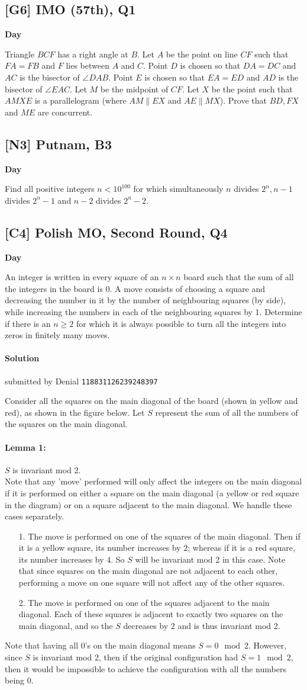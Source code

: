 \documentclass[10pt]{article}
\newcommand{\themonth}{March}
\newcommand{\theyear}{2019}
\newcounter{day}
\newcounter{solution}
\newcounter{datenumber}
\newcommand{\problem}[4][0]{
	\newpage
	\subsection{[#3] \space #2} \hfill 
	{\large\textbf{Day \arabic{day}}} %
	\begin{flushleft} #4 \end{flushleft}
	\vspace{1em}
	\addtocounter{day}{1}
	\addtocounter{datenumber}{1}
	\setcounter{solution}{1}
}
\newcommand{\solution}[4][0]{
	\paragraph{Solution \arabic{solution}} \hfill submitted by #2 \hfill \texttt{#3}
	\begin{flushleft} #4 \end{flushleft}
	\addtocounter{solution}{1}
	\vspace{1em}
}
\begin{document}
\problem[28]{2016 IMO (57th), Q1}{G6}{Triangle $BCF$ has a right angle at $B$. Let $A$ be the point on line $CF$ such that $FA=FB$ and $F$ lies between $A$ and $C$. Point $D$ is chosen so that $DA=DC$ and $AC$ is the bisector of $\angle{DAB}$. Point $E$ is chosen so that $EA=ED$ and $AD$ is the bisector of $\angle{EAC}$. Let $M$ be the midpoint of $CF$. Let $X$ be the point such that $AMXE$ is a parallelogram (where $AM \parallel EX$ and $AE \parallel MX$). Prove that $BD,FX$ and $ME$ are concurrent.}

\problem[29]{2018 Putnam, B3}{N3}{Find all positive integers $n < 10^{100}$ for which simultaneously $n$ divides $2^n, n - 1$ divides $2^n - 1$ and $n - 2$ divides $2^n - 2$.}

\problem[30]{2008 Polish MO, Second Round, Q4}{C4}{An integer is written in every square of an $n \times n$ board such that the sum of all the integers in the board is 0. A move consists of choosing a square and decreasing the number in it by the number of neighbouring squares (by side), while increasing the numbers in each of the neighbouring squares by 1. Determine if there is an $n \geq 2$ for which it is always possible to turn all the integers into zeros in finitely many moves.}

\solution[30]{Denial}{118831126239248397}{
Consider all the squares on the main diagonal of the board (shown in yellow and red), as shown in the figure below. Let $S$ represent the sum of all the numbers of the squares on the main diagonal. \\ 

\paragraph{Lemma 1: }$S$ is invariant mod 2. \\
Note that any 'move' performed will only affect the integers on the main diagonal if it is performed on either a square on the main diagonal (a yellow or red square in the diagram) or on a square adjacent to the main diagonal. We handle these cases separately. 
\begin{enumerate}
	\item[1. ]The move is performed on one of the squares of the main diagonal. Then if it is a yellow square, its number increases by $2$; whereas if it is a red square, its number increases by $4$. So $S$ will be invariant mod 2 in this case. Note that since squares on the main diagonal are not adjacent to each other, performing a move on one square will not affect any of the other squares. 
	\item[2. ]The move is performed on one of the squares adjacent to the main diagonal. Each of these squares is adjacent to exactly two squares on the main diagonal, and so the $S$ decreases by 2 and is thus invariant mod 2. 
\end{enumerate}
Note that having all 0's on the main diagonal means $S = 0 \mod 2$. However, since $S$ is invariant mod 2, then if the original configuration had $S = 1 \mod 2$, then it would be impossible to achieve the configuration with all the numbers being $0$. 
}
\end{document}
